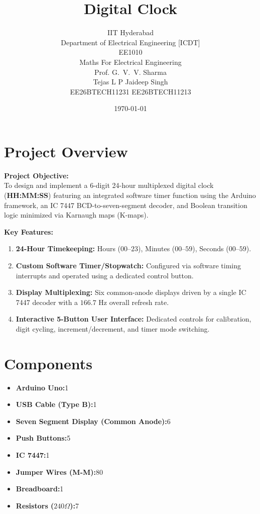 \documentclass[journal,12pt,onecolumn]{IEEEtran}
\title{Digital Clock} \vspace{0.3cm}
\author{IIT Hyderabad \\ \vspace{0.1cm}
		Department of Electrical Engineering [ICDT] \\ 
		\vspace{0.55cm}EE1010     \\ Maths For Electrical Engineering \\ \vspace{0.15cm} Prof. G.~V.~V. Sharma \\\vspace{0.8cm}
		Tejas L P \hspace{4.3cm} Jaideep Singh \\ EE26BTECH11231 \hspace{2.8cm} EE26BTECH11213 \\\vspace{0.2cm} }
\date{\today}
\begin{document}
		
		\maketitle
		\section{Project Overview}
		\noindent \textbf{Project Objective:} \\
		To design and implement a 6-digit 24-hour multiplexed digital clock (\textbf{HH:MM:SS}) featuring an integrated software timer function using the Arduino framework, an IC 7447 BCD-to-seven-segment decoder, and Boolean transition logic minimized via Karnaugh maps (K-maps).
		
		\noindent \textbf{Key Features:}
		\begin{enumerate}
			\item \textbf{24-Hour Timekeeping:} Hours ($00\text{--}23$), Minutes ($00\text{--}59$), Seconds ($00\text{--}59$).
			\item \textbf{Custom Software Timer/Stopwatch:} Configured via software timing interrupts and operated using a dedicated control button.
			\item \textbf{Display Multiplexing:} Six common-anode displays driven by a single IC 7447 decoder with a $166.7\text{ Hz}$ overall refresh rate.
			\item \textbf{Interactive 5-Button User Interface:} Dedicated controls for calibration, digit cycling, increment/decrement, and timer mode switching.
		\end{enumerate}
			\section{Components}
		\begin{itemize}
			\item \textbf{Arduino Uno:}1 
			\item \textbf{USB Cable (Type B):}1 
			\item \textbf{Seven Segment Display (Common Anode):}6 
			\item \textbf{Push Buttons:}5 
			\item \textbf{IC 7447:}1 
			\item \textbf{Jumper Wires (M-M):}80 
			\item \textbf{Breadboard:}1 
			\item \textbf{Resistors ($240\Omega$):}7
		\end{itemize}
		\newpage
		
\end{document}
